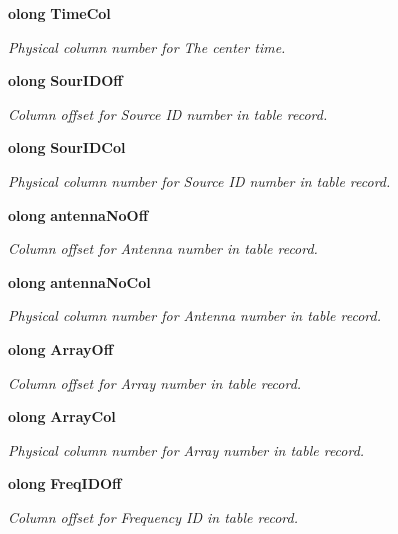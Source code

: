 \begin{CompactItemize}
{\bf olong} {\bf Time\-Col}
\begin{CompactList}\small\item\em Physical column number for The center time. \item\end{CompactList}\item 
{\bf olong} {\bf Sour\-IDOff}
\begin{CompactList}\small\item\em Column offset for Source ID number in table record. \item\end{CompactList}\item 
{\bf olong} {\bf Sour\-IDCol}
\begin{CompactList}\small\item\em Physical column number for Source ID number in table record. \item\end{CompactList}\item 
{\bf olong} {\bf antenna\-No\-Off}
\begin{CompactList}\small\item\em Column offset for Antenna number in table record. \item\end{CompactList}\item 
{\bf olong} {\bf antenna\-No\-Col}
\begin{CompactList}\small\item\em Physical column number for Antenna number in table record. \item\end{CompactList}\item 
{\bf olong} {\bf Array\-Off}
\begin{CompactList}\small\item\em Column offset for Array number in table record. \item\end{CompactList}\item 
{\bf olong} {\bf Array\-Col}
\begin{CompactList}\small\item\em Physical column number for Array number in table record. \item\end{CompactList}\item 
{\bf olong} {\bf Freq\-IDOff}
\begin{CompactList}\small\item\em Column offset for Frequency ID in table record. \item\end{CompactList}\item 

\end{CompactItemize}

